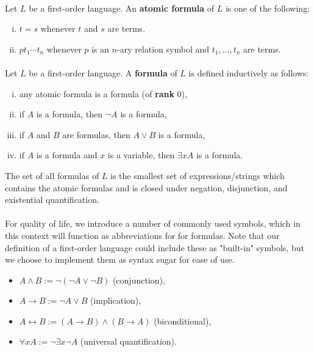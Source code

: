 \documentclass[12pt]{article}
\newlength{\myparskip}
\newenvironment{fullbox}{\begin{lrbox}{\savefullbox}\begin{minipage}{\dimexpr\textwidth-2\fboxsep\relax}\setlength{\parskip}{\myparskip}}{\end{minipage}\end{lrbox}\framebox[\textwidth]{\usebox{\savefullbox}}}
\newenvironment{pbox}[1][]{\begin{fullbox}\def\temp{#1}\ifx\temp\empty\else\paragraph{#1}\phantom{}\fi}{\end{fullbox}}
\theoremstyle{definition}
\newcommand{\<}{\langle}
\renewcommand{\>}{\rangle}
\newcommand{\keyword}{\textbf}
\newcommand{\liff}{\leftrightarrow}
\begin{document}
\begin{pbox}
    Let $L$ be a first-order language.
    An \keyword{atomic formula} of $L$ is one of the following:
    \begin{enumerate}[(i)]
        \item $t = s$ whenever $t$ and $s$ are terms.
        \item $p t_1 \cdots t_n$ whenever $p$ is an $n$-ary relation symbol and $t_1, \dots, t_n$ are terms.
    \end{enumerate}
\end{pbox}

\begin{pbox}
    Let $L$ be a first-order language.
    A \keyword{formula} of $L$ is defined inductively as follows:
    \begin{enumerate}[(i)]
        \item any atomic formula is a formula (of \keyword{rank} $0$),
        \item if $A$ is a formula, then $\lnot A$ is a formula,
        \item if $A$ and $B$ are formulas, then $A \lor B$ is a formula,
        \item if $A$ is a formula and $x$ is a variable, then $\exists x A$ is a formula.
    \end{enumerate}

    The set of all formulas of $L$ is the smallest set of expressions/strings which contains the atomic formulas and is closed under negation, disjunction, and existential quantification.
\end{pbox}

\begin{pbox}
    For quality of life, we introduce a number of commonly used symbols, which in this context will function as abbreviations for for formulas.
    Note that our definition of a first-order language could include these as "built-in" symbols, but we choose to implement them as syntax sugar for ease of use.
    \begin{itemize}
        \item $A \land B := \lnot(\lnot A \lor \lnot B)$ (conjunction),
        \item $A \to B := \lnot A \lor B$ (implication),
        \item $A \liff B := (A \to B) \land (B \to A)$ (biconditional),
        \item $\forall x A := \lnot \exists x \lnot A$ (universal quantification).
    \end{itemize}
\end{pbox}
\end{document}
